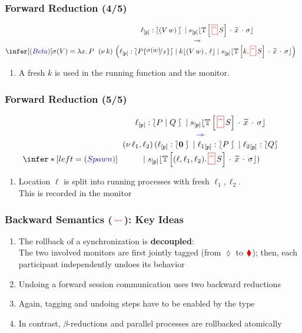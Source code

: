 \documentclass[12pt]{beamer}
\newcommand{\myctxr}[2]{{#1\left[\textcolor{black}{#2}\right]}}
\newcommand{\fwcolor}[1]{\textcolor{blue}{#1}}
\newcommand{\bkcolor}[1]{\textcolor{red}{#1}}
\newcommand{\sred}[1]{\textcolor{myred}{#1}}
\newcommand{\news}[1]{(\nu\, #1)}
\newcommand{\bi}{\begin{enumerate}[$\bullet$]}
\newcommand{\ei}{\end{enumerate}}
\newcommand{\queue}[1]{\lfloor #1 \rfloor}
\newcommand{\store}{\sigma}
\newcommand{\ctx}[1]{\mathbb{#1}}
\newcommand{\mysepp}{\,\cdot\,}
\newcommand{\myeval}[2]{#2(#1)}
\newcommand{\mem}[3]{\ensuremath{#1\queue{#2\mysep #3}}}
\newcommand{\mytilde}[1]{\widetilde{#1}}
\newcommand{\moni}[4]{\ensuremath{{#1\queue{\textcolor{black}{#2}\mysepp #3\mysepp #4}}}}
\newcommand{\past}{\,\text{\textcolor{red}{\textbf{\textasciicircum}}}\,}
\newcommand{\mypast}{\,\sred{\framebox[3mm]{\past}\,}}
\newcommand{\conf}[2]{\lbag #2 \rbag} %
\newcommand{\stack}[1]{\mathtt{#1}}
\newcommand{\abs}[2]{\lambda #1.\,#2}
\newcommand{\Par}{\;|\;}
\newcommand{\appl}[2]{#1\, {#2}}
\newcommand{\fw}{\ensuremath{\fwcolor{\,\twoheadrightarrow\,}}}
\newcommand{\bk}{\ensuremath{\bkcolor{\,\rightsquigarrow\,}}}
\newcommand{\p}{\ensuremath{\mathtt{p}}\xspace}
\newcommand{\key}[2]{#1_{[#2]}}
\newcommand{\np}[2]{#1:#2}
\newcommand{\ep}[2]{#1_{[#2]}}
\newcommand{\mysep}{\,,\,}
\newcommand{\loc}{\ell}
\newcommand{\rmark}{\bkcolor{\blacklozenge}}
\newcommand{\normark}{\lozenge}
\newcommand{\inact}{\mathbf{0}}
\def\subst#1#2{\{\raisebox{.5ex}{\small$#1$}\! / \mbox{\small$#2$}\}}
\begin{document}
 

\begin{frame}
	\frametitle{Forward Reduction  (4/5)}
$$
\infer[\fwcolor{(Beta)}]{\myeval{V}{\sigma} =\abs{x}{P} }
{
{\begin{tabular}[b]{c}
$\np{\key{\loc}{\p}}{\conf{\stack{C}}{(\appl{V}{w})}} \Par \moni{\ep{s}{\p}}{\myctxr{\ctx{T}}{\mypast S}}{\mytilde x}{\store}$ 
\\
\fw 
\\
$\news{k}\, \left( {\np{\key{\loc}{\p}}{\conf{\ctx{\stack {C}}}{P\subst{\myeval{w}{\sigma}}{x}}}}  \Par \mem{k}{(\appl{V}{w})}{\loc} \Par\moni{\ep{s}{\p}}{\myctxr{\ctx T}{ k. \mypast S}}{\mytilde x}{\store} \right)$
\end{tabular}}
}
$$
\bi
\item A fresh $k$ is used in the running function and the monitor. 
\ei
\end{frame}	

\begin{frame}
	\frametitle{Forward Reduction  (5/5)}
$$
\infer*[left=\fwcolor{(Spawn)}]{  }
{
{\begin{tabular}[b]{c}
$\np{\key{\loc}{\p}}{\conf{\stack{C}}{P \Par Q}} \Par \moni{\ep{s}{\p}}{\myctxr{\ctx{T}}{\mypast S}}{\mytilde x}{\store}$
\\
\fw
\\
$\news{\loc_1,\loc_2}\, ( \np{\key{\loc}{\p}}{\conf{\stack{C}}{\inact}}  
\Par \np{\key{{\loc_1}}{\p}}{\conf{\inact}{P}}
\Par \np{\key{{\loc_2}}{\p}}{\conf{\inact}{Q}} 
$
\\[1mm]
$\Par \moni{\ep{s}{\p}}{\myctxr{\ctx T}{ (\loc,\loc_1,\loc_2). \mypast S}}{\mytilde x}{\store})
$
\end{tabular}}
}
$$

\bi
\item Location $\loc$ is split into running processes with fresh $\loc_1, \loc_2$.  \\
This is recorded in the monitor
\ei
\end{frame}	

\begin{frame}
\frametitle{Backward Semantics ($\bk$): Key Ideas}
\bi
\item The rollback of a synchronization is \textbf{decoupled}: \\
The two involved monitors are first jointly tagged (from $\normark$ to $\rmark$); then, each participant independently undoes its behavior
\item Undoing a forward session communication uses two backward reductions
\item Again, tagging and undoing steps have to be enabled by the type
\item In contrast, $\beta$-reductions and parallel processes are rollbacked atomically
\ei
\end{frame}
\end{document}

